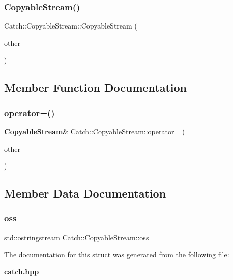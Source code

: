 \mbox{\label{struct_catch_1_1_copyable_stream_a0e72dc16240653f52c17106f4bf34da8}} 
\subsubsection{Copyable\+Stream()\hspace{0.1cm}{\footnotesize\ttfamily [2/2]}}
{\footnotesize\ttfamily Catch\+::\+Copyable\+Stream\+::\+Copyable\+Stream (\begin{DoxyParamCaption}\item[{\textbf{ Copyable\+Stream} const \&}]{other }\end{DoxyParamCaption})\hspace{0.3cm}{\ttfamily [inline]}}



\subsection{Member Function Documentation}
\mbox{\label{struct_catch_1_1_copyable_stream_a1760fa29b38011c5845171260bec0966}} 
\subsubsection{operator=()}
{\footnotesize\ttfamily \textbf{ Copyable\+Stream}\& Catch\+::\+Copyable\+Stream\+::operator= (\begin{DoxyParamCaption}\item[{\textbf{ Copyable\+Stream} const \&}]{other }\end{DoxyParamCaption})\hspace{0.3cm}{\ttfamily [inline]}}



\subsection{Member Data Documentation}
\mbox{\label{struct_catch_1_1_copyable_stream_ae123fb4d673e7d7a13a3c5f6bc5d426c}} 
\subsubsection{oss}
{\footnotesize\ttfamily std\+::ostringstream Catch\+::\+Copyable\+Stream\+::oss}



The documentation for this struct was generated from the following file\+:\begin{DoxyCompactItemize}
\item 
\textbf{ catch.\+hpp}\end{DoxyCompactItemize}
